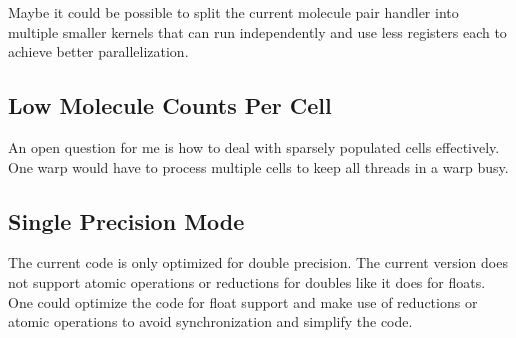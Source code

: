 Maybe it could be possible to split the current molecule pair handler into multiple smaller kernels that can run independently and use less registers each to achieve better parallelization.

\subsection{Low Molecule Counts Per Cell}
An open question for me is how to deal with sparsely populated cells effectively. One warp would have to process multiple cells to keep all threads in a warp busy.

\subsection{Single Precision Mode}
The current code is only optimized for double precision. The current \cuda{} version does not support atomic operations or reductions for doubles like it does for floats. One could optimize the code for float support and make use of reductions or atomic operations to avoid synchronization and simplify the code.
